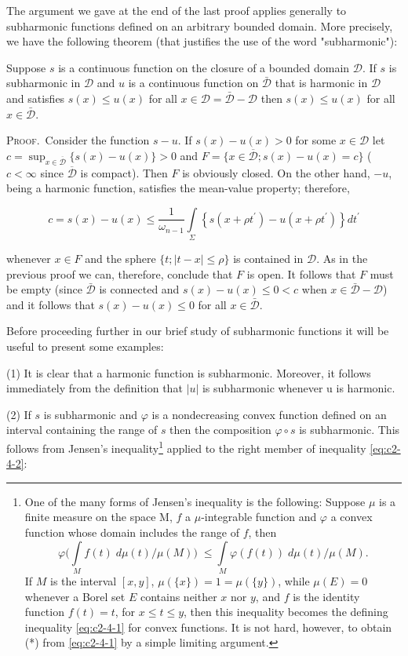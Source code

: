 The argument we gave at the end of the last proof applies generally to subharmonic functions defined on an arbitrary bounded domain. More precisely, we have the following theorem (that justifies the use of the word "subharmonic"):

\begin{theorem}
\label{thm:c2-4-5}
Suppose $s$ is a continuous function on the closure of a bounded domain $\mathcal{D}$. If $s$ is subharmonic in $\mathcal{D}$ and $u$ is a continuous function on $\bar{\mathcal{D}}$ that is harmonic in $\mathcal{D}$ and satisfies $s(x) \leq u(x)$ for all $x \in \mathcal{D} = \bar{\mathcal{D}} - \mathcal{D}$ then $s(x) \leq u(x)$ for all $x \in \bar{\mathcal{D}}$.
\end{theorem}

\textsc{Proof.}\ Consider the function $s - u$. If $s(x) - u(x) > 0$ for some $x \in \mathcal{D}$ let $c = \sup_{x \in \overline{\mathcal{D}}} \{s(x) - u(x)\} > 0$ and $F = \{x \in \overline{\mathcal{D}}; s(x) - u(x) = c\}$ ($c < \infty$ since $\overline{\mathcal{D}}$ is compact). Then $F$ is obviously closed. On the other hand, $-u$, being a harmonic function, satisfies the mean-value property; therefore,

\[
c=s(x)-u(x)\leq\frac{1}{\omega_{n-1}}\int\limits_{\Sigma}\left\{s(x+\rho t^{\prime})-u(x+\rho t^{\prime})\right\}d t^{\prime}
\]

whenever $x \in F$ and the sphere $\{t; |t - x| \leq \rho\}$ is contained in $\mathcal{D}$. As in the previous proof we can, therefore, conclude that $F$ is open. It follows that $F$ must be empty (since $\bar{\mathcal{D}}$ is connected and $s(x) - u(x) \leq 0 < c$ when $x \in \bar{\mathcal{D}} - \mathcal{D}$) and it follows that $s(x) - u(x) \leq 0$ for all $x \in \bar{\mathcal{D}}$.

Before proceeding further in our brief study of subharmonic functions it will be useful to present some examples:

(1) It is clear that a harmonic function is subharmonic. Moreover, it follows immediately from the definition that $|u|$ is subharmonic whenever u is harmonic.

(2) If $s$ is subharmonic and $\varphi$ is a nondecreasing convex function defined on an interval containing the range of $s$ then the composition $\varphi \circ s$ is subharmonic. This follows from Jensen's inequality\footnote{One of the many forms of Jensen's inequality is the following: Suppose $\mu$ is a finite measure on the space M, $f$ a $\mu$-integrable function and $\varphi$ a convex function whose domain includes the range of $f$, then 
\begin{equation}\tag{*}
\varphi\Biggl(\int\limits_{M}f(t)\;d\mu(t)/\mu(M)\Biggr)\;\leq\int\limits_{M}\varphi(f(t))\;d\mu(t)/\mu(M).
\end{equation}
 If $M$ is the interval $[x, y]$, $\mu(\{x\}) = 1 = \mu(\{y\})$, while $\mu(E) = 0$ whenever a Borel set $E$ contains neither $x$ nor $y$, and $f$ is the identity function $f(t) = t$, for $x \leq t \leq y$, then this inequality becomes the defining inequality \eqref{eq:c2-4-1} for convex functions. It is not hard, however, to obtain (*) from \eqref{eq:c2-4-1} by a simple limiting argument.} applied to the right member of inequality \eqref{eq:c2-4-2}:

